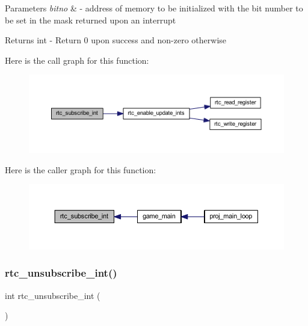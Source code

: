 \begin{DoxyParams}{Parameters}
{\em bitno} & -\/ address of memory to be initialized with the bit number to be set in the mask returned upon an interrupt \\
\hline
\end{DoxyParams}
\begin{DoxyReturn}{Returns}
int -\/ Return 0 upon success and non-\/zero otherwise 
\end{DoxyReturn}
Here is the call graph for this function\+:
\nopagebreak
\begin{figure}[H]
\begin{center}
\leavevmode
\includegraphics[width=350pt]{group__rtc_ga7c28e3528db0f743706f9c01608331a7_cgraph}
\end{center}
\end{figure}
Here is the caller graph for this function\+:
\nopagebreak
\begin{figure}[H]
\begin{center}
\leavevmode
\includegraphics[width=350pt]{group__rtc_ga7c28e3528db0f743706f9c01608331a7_icgraph}
\end{center}
\end{figure}
\mbox{\label{group__rtc_gab8f17bf5280c908c8b199a90fefcc758}} 
\subsubsection{\texorpdfstring{rtc\+\_\+unsubscribe\+\_\+int()}{rtc\_unsubscribe\_int()}}
{\footnotesize\ttfamily int rtc\+\_\+unsubscribe\+\_\+int (\begin{DoxyParamCaption}{ }\end{DoxyParamCaption})}



